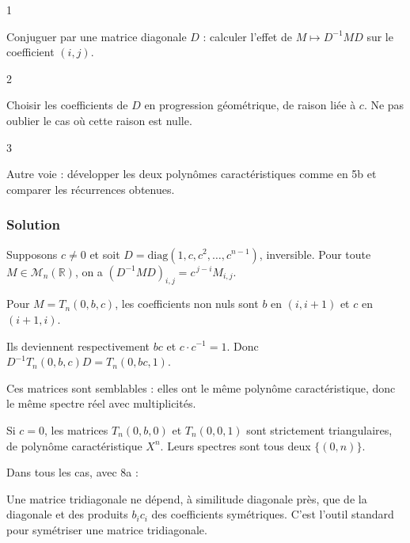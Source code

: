\documentclass[11pt,a4paper]{article}
\newcommand{\equationajustee}[1]{%
  \sbox{\boiteequation}{$\displaystyle #1$}%
  \ifdim\wd\boiteequation>\linewidth
    \[\resizebox{\linewidth}{!}{\usebox{\boiteequation}}\]%
  \else
    \[#1\]%
  \fi}
\begin{document}
\begin{indication}{1}

Conjuguer par une matrice diagonale \(D\) : calculer l'effet de \(M\mapsto D^{-1}MD\) sur le coefficient \((i,j)\).

\end{indication}

\begin{indication}{2}

Choisir les coefficients de \(D\) en progression géométrique, de raison liée à \(c\). Ne pas oublier le cas où cette raison est nulle.

\end{indication}

\begin{indication}{3}

Autre voie : développer les deux polynômes caractéristiques comme en 5b et comparer les récurrences obtenues.

\end{indication}

\hypertarget{solution-14}{%
\subsubsection{Solution}\label{solution-14}}

Supposons \(c\neq0\) et soit \(D=\mathrm{diag}(1,c,c^2,\dots,c^{n-1})\), inversible. Pour toute \(M\in\mathcal M_n(\mathbb R)\), on a \((D^{-1}MD)_{i,j}=c^{\,j-i}M_{i,j}\).

Pour \(M=T_n(0,b,c)\), les coefficients non nuls sont \(b\) en \((i,i+1)\) et \(c\) en \((i+1,i)\).

Ils deviennent respectivement \(bc\) et \(c\cdot c^{-1}=1\). Donc \(D^{-1}T_n(0,b,c)D=T_n(0,bc,1)\).

Ces matrices sont semblables : elles ont le même polynôme caractéristique, donc le même spectre réel avec multiplicités.

Si \(c=0\), les matrices \(T_n(0,b,0)\) et \(T_n(0,0,1)\) sont strictement triangulaires, de polynôme caractéristique \(X^n\). Leurs spectres sont tous deux \(\{(0,n)\}\).

Dans tous les cas, avec 8a :

\equationajustee{\boxed{\mathrm{Sp}(T_n(a,b,c))=\{(\mu+a,\,m_\mu)\ :\ (\mu,m_\mu)\in\mathrm{Sp}(T_n(0,bc,1))\}.}}

\begin{methode}

Une matrice tridiagonale ne dépend, à similitude diagonale près, que de la diagonale et des produits \(b_ic_i\) des coefficients symétriques. C'est l'outil standard pour symétriser une matrice tridiagonale.

\end{methode}
\end{document}
